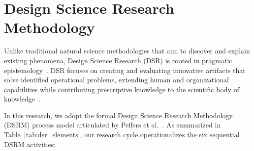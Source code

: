 \section{Design Science Research Methodology}
\label{sec:dsr_methodology}

Unlike traditional natural science methodologies that aim to discover and explain existing phenomena, Design Science Research (DSR) is rooted in pragmatic epistemology~\cite{simon_1969}. DSR focuses on creating and evaluating innovative artifacts that solve identified operational problems, extending human and organizational capabilities while contributing prescriptive knowledge to the scientific body of knowledge~\cite{hevner_2004, gregor_2013}.

In this research, we adopt the formal Design Science Research Methodology (DSRM) process model articulated by Peffers et al.~\cite{peffers_2007}. As summarized in Table~\ref{tab:dsr_elements}, our research cycle operationalizes the six sequential DSRM activities:



